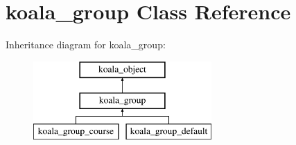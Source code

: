 \hypertarget{classkoala__group}{
\section{koala\_\-group Class Reference}
\label{classkoala__group}
}
Inheritance diagram for koala\_\-group:\begin{figure}[H]
\begin{center}
\leavevmode
\includegraphics[height=3.000000cm]{classkoala__group}
\end{center}
\end{figure}
